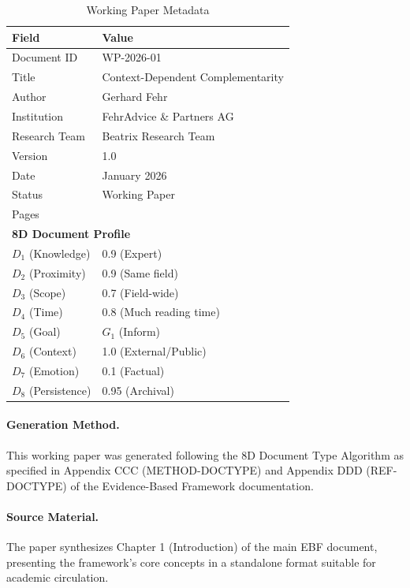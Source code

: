 \documentclass[12pt,a4paper]{article}
\theoremstyle{definition}
\begin{document}
\begin{table}[htbp]
\centering
\caption{Working Paper Metadata}
\begin{tabular}{@{}ll@{}}
\toprule
\textbf{Field} & \textbf{Value} \\
\midrule
Document ID & WP-2026-01 \\
Title & Context-Dependent Complementarity \\
Author & Gerhard Fehr \\
Institution & FehrAdvice \& Partners AG \\
Research Team & Beatrix Research Team \\
Version & 1.0 \\
Date & January 2026 \\
Status & Working Paper \\
Pages & \pageref{LastPage} \\
\midrule
\multicolumn{2}{l}{\textbf{8D Document Profile}} \\
\midrule
$D_1$ (Knowledge) & 0.9 (Expert) \\
$D_2$ (Proximity) & 0.9 (Same field) \\
$D_3$ (Scope) & 0.7 (Field-wide) \\
$D_4$ (Time) & 0.8 (Much reading time) \\
$D_5$ (Goal) & $G_1$ (Inform) \\
$D_6$ (Context) & 1.0 (External/Public) \\
$D_7$ (Emotion) & 0.1 (Factual) \\
$D_8$ (Persistence) & 0.95 (Archival) \\
\bottomrule
\end{tabular}
\end{table}

\paragraph{Generation Method.}
This working paper was generated following the 8D Document Type Algorithm as specified in Appendix CCC (METHOD-DOCTYPE) and Appendix DDD (REF-DOCTYPE) of the Evidence-Based Framework documentation.

\paragraph{Source Material.}
The paper synthesizes Chapter 1 (Introduction) of the main EBF document, presenting the framework's core concepts in a standalone format suitable for academic circulation.


\end{document}
